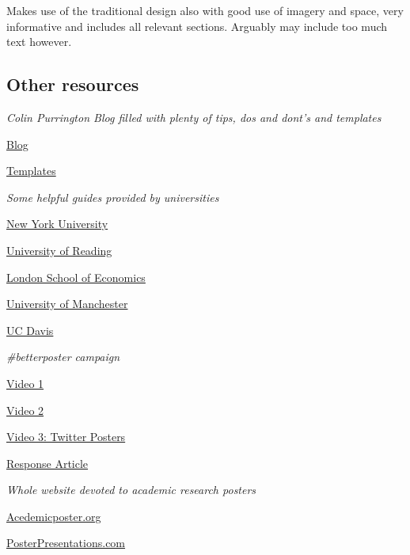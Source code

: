 \documentclass[
  titlepage]{book}
\begin{document}
Makes use of the traditional design also with good use of imagery and space, very informative and includes all relevant sections. Arguably may include too much text however.

\hypertarget{other-resources-1}{%
\subsection{Other resources}\label{other-resources-1}}

\emph{Colin Purrington Blog filled with plenty of tips, dos and dont's and templates}

\href{https://colinpurrington.com/tips/poster-design/}{Blog}

\href{https://colinpurrington.com/2019/06/templates-for-better-posters/}{Templates}

\emph{Some helpful guides provided by universities}

\href{https://guides.nyu.edu/posters}{New York University}

\href{https://www.reading.ac.uk/web/files/dps/Conference_poster_PPT_examples.pdf}{University of Reading}

\href{https://blogs.lse.ac.uk/impactofsocialsciences/2018/05/11/how-to-design-an-award-winning-conference-poster/}{London School of Economics}

\href{http://www.supi.manchester.ac.uk/forteachers/academicposterguidance/}{University of Manchester}

\href{https://urc.ucdavis.edu/creating-effective-academic-posters}{UC Davis}

\emph{\#betterposter campaign}

\href{https://www.youtube.com/watch?v=1RwJbhkCA58\&t=2s\&ab_channel=MikeMorrison}{Video 1}

\href{https://www.youtube.com/watch?v=SYk29tnxASs\&ab_channel=MikeMorrison}{Video 2}

\href{https://www.youtube.com/watch?v=fQDL8r3r_d4\&ab_channel=MikeMorrison}{Video 3: Twitter Posters}

\href{https://www.insidehighered.com/news/2019/06/24/theres-movement-better-scientific-posters-are-they-really-better}{Response Article}

\emph{Whole website devoted to academic research posters}

\href{https://www.academicposter.org/}{Acedemicposter.org}

\href{https://www.posterpresentations.com/index.html}{PosterPresentations.com}
\end{document}
